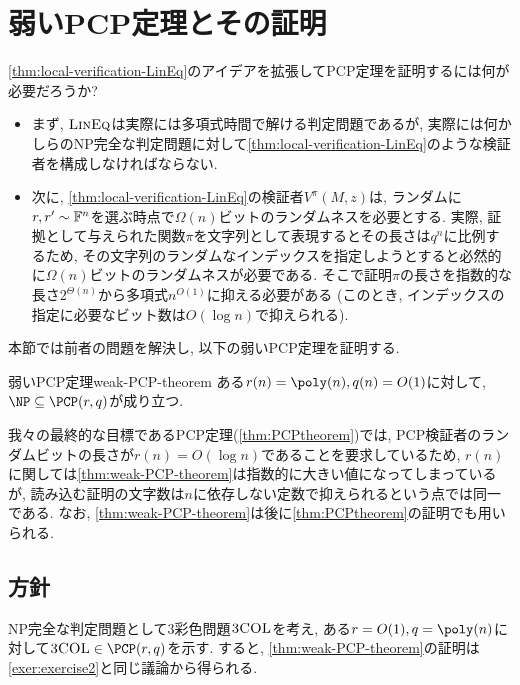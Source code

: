 \section{弱いPCP定理とその証明}
\cref{thm:local-verification-LinEq}のアイデアを拡張してPCP定理を証明するには何が必要だろうか?
\begin{itemize}
  \item まず, $\textsc{LinEq}$は実際には多項式時間で解ける判定問題であるが, 実際には何かしらのNP完全な判定問題に対して\cref{thm:local-verification-LinEq}のような検証者を構成しなければならない.  
  \item 次に, \cref{thm:local-verification-LinEq}の検証者$V^\pi(M,z)$は, ランダムに$r,r'\sim\mathbb{F}^n$を選ぶ時点で$\Omega(n)$ビットのランダムネスを必要とする. 実際, 証拠として与えられた関数$\pi$を文字列として表現するとその長さは$q^n$に比例するため, その文字列のランダムなインデックスを指定しようとすると必然的に$\Omega(n)$ビットのランダムネスが必要である. そこで証明$\pi$の長さを指数的な長さ$2^{\Theta(n)}$から多項式$n^{O(1)}$に抑える必要がある (このとき, インデックスの指定に必要なビット数は$O(\log n)$で抑えられる).
\end{itemize}

本節では前者の問題を解決し, 以下の弱いPCP定理を証明する.
\begin{theorem}{弱いPCP定理}{weak-PCP-theorem}
  ある$r(n)=\poly(n),q(n)=O(1)$に対して, $\NP \subseteq \PCP(r,q)$が成り立つ.
\end{theorem}

我々の最終的な目標であるPCP定理(\cref{thm:PCPtheorem})では, PCP検証者のランダムビットの長さが$r(n)=O(\log n)$であることを要求しているため, $r(n)$に関しては\cref{thm:weak-PCP-theorem}は指数的に大きい値になってしまっているが, 読み込む証明の文字数は$n$に依存しない定数で抑えられるという点では同一である.
なお, \cref{thm:weak-PCP-theorem}は後に\cref{thm:PCPtheorem}の証明でも用いられる.

\subsection{方針}
  NP完全な判定問題として3彩色問題$\textsc{3COL}$を考え, ある$r=O(1),q=\poly(n)$に対して$\ThreeCOL\in\PCP(r,q)$を示す.
  すると, \cref{thm:weak-PCP-theorem}の証明は\cref{exer:exercise2}と同じ議論から得られる.

